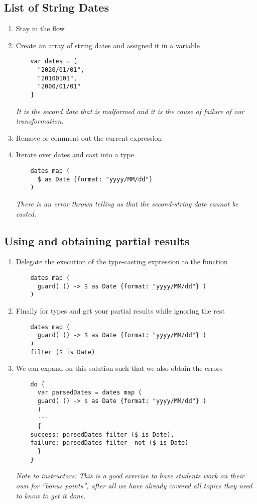 \subsection{List of String Dates}
\begin{enumerate}
\item Stay in the  flow
\item Create an array of string dates and assigned it in a variable
  \begin{verbatim}
    var dates = [
      "2020/01/01",
      "20100101",
      "2000/01/01"
    ]
  \end{verbatim}
  \emph{
    It is the second date that is malformed and it is the cause of failure of our transformation.
  }
\item Remove or comment out the current expression
\item Iterate over dates and cast into a  type
  \begin{verbatim}
    dates map (
      $ as Date {format: "yyyy/MM/dd"}
    )
  \end{verbatim}
  \emph{
    There is an error thrown telling us that the second-string date cannot be casted.
  }
\end{enumerate}

\subsection{Using  and obtaining partial results}
\begin{enumerate}[resume*]
\item Delegate the execution of the type-casting expression to the  function
  \begin{verbatim}
    dates map (
      guard( () -> $ as Date {format: "yyyy/MM/dd"} )
    ) 
  \end{verbatim}
\item Finally  for  types and get your partial results while ignoring the rest
  \begin{verbatim}
    dates map (
      guard( () -> $ as Date {format: "yyyy/MM/dd"} )
    )
    filter ($ is Date)
  \end{verbatim}
\item We can expand on this solution such that we also obtain the errors
  \begin{verbatim}
    do {
      var parsedDates = dates map (
      guard( () -> $ as Date {format: "yyyy/MM/dd"} )
      )
      ---
      {
	success: parsedDates filter ($ is Date),
	failure: parsedDates filter  not ($ is Date)
      }
    }
  \end{verbatim}
  \emph{
    Note to instructors: This is a good exercise to have students work on their own for ``bonus points'', after all we have already covered all topics they need to know to get it done.
  }
\end{enumerate}
